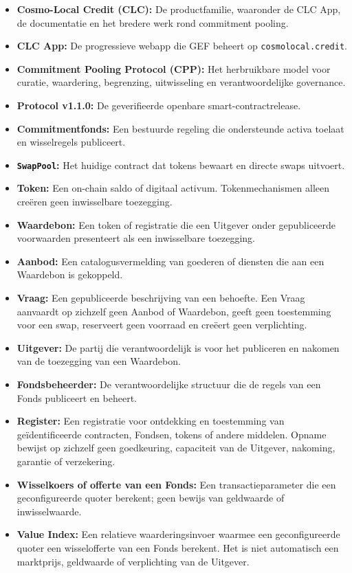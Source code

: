 \documentclass[11pt]{article}
\begin{document}
\begin{itemize}[leftmargin=*]
\item \textbf{Cosmo-Local Credit (CLC):} De productfamilie, waaronder de CLC App, de documentatie en het bredere werk rond commitment pooling.
\item \textbf{CLC App:} De progressieve webapp die GEF beheert op \texttt{cosmolocal.credit}.
\item \textbf{Commitment Pooling Protocol (CPP):} Het herbruikbare model voor curatie, waardering, begrenzing, uitwisseling en verantwoordelijke governance.
\item \textbf{Protocol v1.1.0:} De geverifieerde openbare smart-contractrelease.
\item \textbf{Commitmentfonds:} Een bestuurde regeling die ondersteunde activa toelaat en wisselregels publiceert.
\item \textbf{\texttt{SwapPool}:} Het huidige contract dat tokens bewaart en directe swaps uitvoert.
\item \textbf{Token:} Een on-chain saldo of digitaal activum. Tokenmechanismen alleen creëren geen inwisselbare toezegging.
\item \textbf{Waardebon:} Een token of registratie die een Uitgever onder gepubliceerde voorwaarden presenteert als een inwisselbare toezegging.
\item \textbf{Aanbod:} Een catalogusvermelding van goederen of diensten die aan een Waardebon is gekoppeld.
\item \textbf{Vraag:} Een gepubliceerde beschrijving van een behoefte. Een Vraag aanvaardt op zichzelf geen Aanbod of Waardebon, geeft geen toestemming voor een swap, reserveert geen voorraad en creëert geen verplichting.
\item \textbf{Uitgever:} De partij die verantwoordelijk is voor het publiceren en nakomen van de toezegging van een Waardebon.
\item \textbf{Fondsbeheerder:} De verantwoordelijke structuur die de regels van een Fonds publiceert en beheert.
\item \textbf{Register:} Een registratie voor ontdekking en toestemming van geïdentificeerde contracten, Fondsen, tokens of andere middelen. Opname bewijst op zichzelf geen goedkeuring, capaciteit van de Uitgever, nakoming, garantie of verzekering.
\item \textbf{Wisselkoers of offerte van een Fonds:} Een transactieparameter die een geconfigureerde quoter berekent; geen bewijs van geldwaarde of inwisselwaarde.
\item \textbf{Value Index:} Een relatieve waarderingsinvoer waarmee een geconfigureerde quoter een wisselofferte van een Fonds berekent. Het is niet automatisch een marktprijs, geldwaarde of verplichting van de Uitgever.

\end{itemize}
\end{document}
